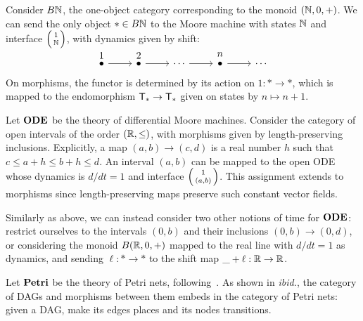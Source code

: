 \begin{example}
	Consider $B\mathbb{N}$, the one-object category corresponding to the monoid $(\mathbb{N},0,+)$.
	We can send the only object $\ast \in B\mathbb{N}$ to the Moore machine with states $\mathbb{N}$ and interface $\lens{1}{\N}$, with dynamics given by shift:
	\begin{equation}
		\begin{tikzcd}[ampersand replacement=\&]
			{\Overset{1}\bullet} \& {\Overset{2}\bullet} \& \cdots \& {\Overset{n}\bullet} \& \cdots
			\arrow[from=1-1, to=1-2]
			\arrow[from=1-2, to=1-3]
			\arrow[from=1-3, to=1-4]
			\arrow[from=1-4, to=1-5]
		\end{tikzcd}
	\end{equation}
	On morphisms, the functor is determined by its action on $1:\ast \to \ast$, which is mapped to the endomorphism $\mathsf{T}_\ast \to \mathsf{T}_\ast$ given on states by $n \mapsto n+1$.
\end{example}

\begin{example}
	Let $\mathbf{ODE}$ be the theory of differential Moore machines.
	Consider the category of open intervals of the order $(\mathbb{R},\leq)$, with morphisms given by length-preserving inclusions.
	Explicitly, a map $(a,b) \to (c,d)$ is a real number $h$ such that $c \leq a+h \leq b+h \leq d$.
	An interval $(a,b)$ can be mapped to the open ODE whose dynamics is $d/dt = 1$ and interface $\lens{1}{(a,b)}$.
	This assignment extends to morphisms since length-preserving maps preserve such constant vector fields.
\end{example}

\begin{example}
	Similarly as above, we can instead consider two other notions of time for $\mathbf{ODE}$: restrict ourselves to the intervals $(0,b)$ and their inclusions $(0,b) \to (0,d)$, or considering the monoid $B(\mathbb{R}, 0, +)$ mapped to the real line with $d/dt=1$ as dynamics, and sending $\ell:\ast \to \ast$ to the shift map $\_+\ell:\mathbb{R} \to \mathbb{R}$.
\end{example}

\begin{example}
	Let $\mathbf{Petri}$ be the theory of Petri nets, following~\cite{kock_whole-grain_2022}.
	As shown in \emph{ibid.}, the category of DAGs and morphisms between them embeds in the category of Petri nets: given a DAG, make its edges places and its nodes transitions.
\end{example}

